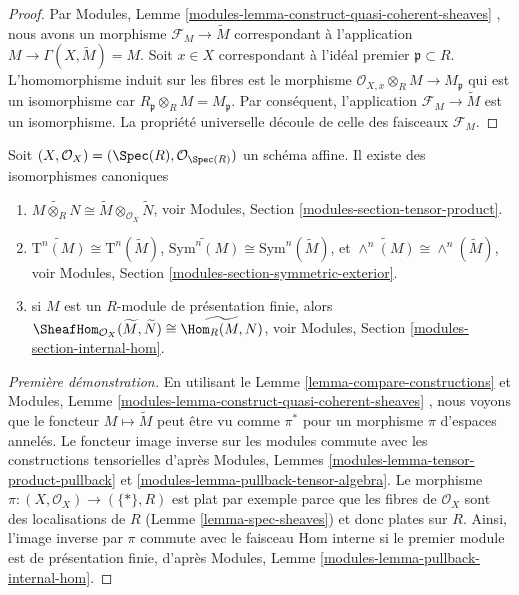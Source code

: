 \begin{proof}
Par Modules, Lemme  \ref{modules-lemma-construct-quasi-coherent-sheaves} , nous avons un morphisme  $\mathcal{F}_M \to \widetilde M$ 
correspondant à l'application  $M \to \Gamma(X, \widetilde M) = M$. Soit  $x \in X$  correspondant à
l'idéal premier  $\mathfrak p \subset R$. L'homomorphisme induit sur les fibres est le morphisme
 $\mathcal{O}_{X, x} \otimes_R M \to M_{\mathfrak p}$  qui est un isomorphisme car  $R_{\mathfrak p} \otimes_R M = M_{\mathfrak p}$. Par conséquent,
l'application  $\mathcal{F}_M \to \widetilde M$  est un isomorphisme. La propriété universelle découle
de celle des faisceaux  $\mathcal{F}_M$.
\end{proof}

\begin{lemma}
\label{lemma-widetilde-constructions}
Soit  $(X, \mathcal{O}_X) = (\Spec(R), \mathcal{O}_{\Spec(R)})$  un schéma affine. Il existe des isomorphismes canoniques
\begin{enumerate}
\item $
\widetilde{M \otimes_R N}
\cong
\widetilde M \otimes_{\mathcal{O}_X} \widetilde N
$, voir Modules, Section  \ref{modules-section-tensor-product}.
\item $
\widetilde{\text{T}^n(M)}
\cong
\text{T}^n(\widetilde M)
$,  $
\widetilde{\text{Sym}^n(M)}
\cong
\text{Sym}^n(\widetilde M)
$, et  $
\widetilde{\wedge^n(M)}
\cong
\wedge^n(\widetilde M)
$, voir Modules, Section  \ref{modules-section-symmetric-exterior}.
\item si  $M$  est un  $R$-module de présentation finie, alors
 $
\SheafHom_{\mathcal{O}_X}(\widetilde M, \widetilde N)
\cong
\widetilde{\Hom_R(M,  N)}
$, voir Modules, Section  \ref{modules-section-internal-hom}.
\end{enumerate}
\end{lemma}

\begin{proof}[Première démonstration]
En utilisant le Lemme  \ref{lemma-compare-constructions}  et Modules, Lemme  \ref{modules-lemma-construct-quasi-coherent-sheaves} , nous
voyons que le foncteur  $M \mapsto \widetilde M$  peut être vu comme  $\pi^*$  pour un
morphisme  $\pi$  d'espaces annelés. Le foncteur image inverse sur les modules
commute avec les constructions tensorielles d'après Modules, Lemmes  \ref{modules-lemma-tensor-product-pullback}  et
 \ref{modules-lemma-pullback-tensor-algebra}. Le morphisme  $\pi : (X, \mathcal{O}_X) \to (\{*\}, R)$  est plat par exemple parce que les fibres
de  $\mathcal{O}_X$  sont des localisations de  $R$  (Lemme  \ref{lemma-spec-sheaves}) et
donc plates sur  $R$. Ainsi, l'image inverse par  $\pi$  commute
avec le faisceau Hom interne si le premier module est de présentation finie, d'après Modules,
Lemme  \ref{modules-lemma-pullback-internal-hom}.
\end{proof}

